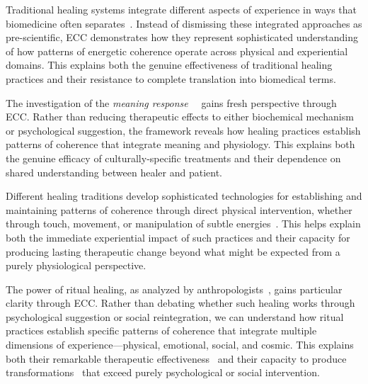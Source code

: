 Traditional healing systems integrate different aspects of experience in ways that biomedicine often separates~\cite{kapferer1991celebration,kapferer1997feast}. Instead of dismissing these integrated approaches as pre-scientific, ECC demonstrates how they represent sophisticated understanding of how patterns of energetic coherence operate across physical and experiential domains. This explains both the genuine effectiveness of traditional healing practices and their resistance to complete translation into biomedical terms.

The investigation of the \textit{meaning response}~~\cite{moerman2002meaning,csordas1994embodiment} gains fresh perspective through ECC. Rather than reducing therapeutic effects to either biochemical mechanism or psychological suggestion, the framework reveals how healing practices establish patterns of coherence that integrate meaning and physiology. This explains both the genuine efficacy of culturally-specific treatments and their dependence on shared understanding between healer and patient.

Different healing traditions develop sophisticated technologies for establishing and maintaining patterns of coherence through direct physical intervention, whether through touch, movement, or manipulation of subtle energies~\cite{csordas1993somatic,desjarlais1992body}. This helps explain both the immediate experiential impact of such practices and their capacity for producing lasting therapeutic change beyond what might be expected from a purely physiological perspective.

The power of ritual healing, as analyzed by anthropologists~\cite{turner1968drums,turner1982ritual}, gains particular clarity through ECC. Rather than debating whether such healing works through psychological suggestion or social reintegration, we can understand how ritual practices establish specific patterns of coherence that integrate multiple dimensions of experience—physical, emotional, social, and cosmic. This explains both their remarkable therapeutic effectiveness~ and their capacity to produce transformations~ that exceed purely psychological or social intervention.

